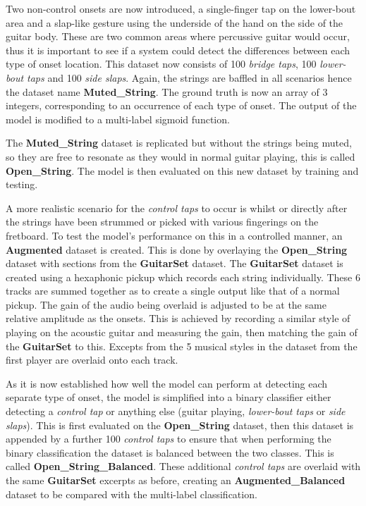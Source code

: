 \documentclass[conference]{IEEEtran}
\begin{document}
Two non-control onsets are now introduced, a single-finger tap on the lower-bout area and a slap-like gesture using the underside of the hand on the side of the guitar body. These are two common areas where percussive guitar would occur, thus
it is important to see if a system could detect the differences between each type of onset location. This dataset now consists of 100 \emph{bridge taps}, 100 \emph{lower-bout taps} and 100 \emph{side slaps}. Again, the strings are baffled in all scenarios hence the dataset name \textbf{Muted\_String}.
The ground truth is now an array of 3 integers, corresponding to an occurrence of each type of onset. The output of the model is modified to a multi-label sigmoid function. 

The \textbf{Muted\_String} dataset is replicated but without the strings being muted, so they are free to resonate as they would in normal guitar playing, this is called \textbf{Open\_String}. The model is then evaluated on this new dataset by training and testing.

A more realistic scenario for the \emph{control taps} to occur is whilst or directly after the strings have been strummed or picked with various fingerings on the fretboard. To test the model's performance on this in a controlled manner, an \textbf{Augmented} dataset is created. 
This is done by overlaying the \textbf{Open\_String} dataset with sections from the \textbf{GuitarSet} dataset. The \textbf{GuitarSet} dataset is created using a hexaphonic pickup which records each string individually. These 6 tracks are summed together as
to create a single output like that of a normal pickup. The gain of the audio being overlaid is adjusted to be at the same relative amplitude as the onsets. This is achieved by recording a similar style of playing on the acoustic guitar and measuring the gain, then matching
the gain of the \textbf{GuitarSet} to this. Excepts from the 5 musical styles in the dataset from the first player are overlaid onto each track. 

As it is now established how well the model can perform at detecting each separate type of onset, the model is simplified into a binary classifier either detecting a \emph{control tap} or anything else (guitar playing, \emph{lower-bout taps} or \emph{side slaps}). 
This is first evaluated on the \textbf{Open\_String} dataset, then this dataset is appended by a further 100 \emph{control taps} to ensure that when performing the binary classification the dataset is balanced between the two classes. This is called \textbf{Open\_String\_Balanced}. 
These additional \emph{control taps} are overlaid with the same \textbf{GuitarSet} excerpts as before, creating an \textbf{Augmented\_Balanced} dataset to be compared with the multi-label classification.
\end{document}
